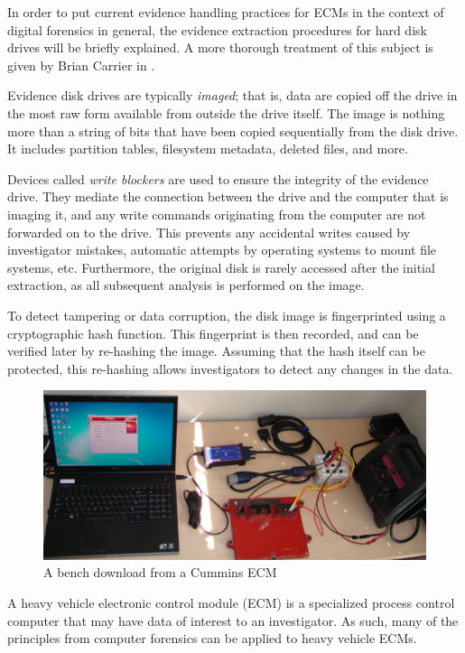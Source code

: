 In order to put current evidence handling practices for ECMs in the context of digital forensics in general, the evidence extraction
procedures for hard disk drives will be briefly explained. A more thorough treatment of this subject is given by Brian Carrier in \cite{carrier2005}.

Evidence disk drives are typically \emph{imaged}; that is, data are copied off the drive in the most raw form available from outside
the drive itself. The image is nothing more than a string of bits that have been copied sequentially from the disk drive. It includes
partition tables, filesystem metadata, deleted files, and more.

Devices called \emph{write blockers} are used to ensure the integrity of the evidence drive\cite{carrier2005}. They mediate the connection between the
drive and the computer that is imaging it, and any write commands originating from the computer are not forwarded on to the drive.
This prevents any accidental writes caused by investigator mistakes, automatic attempts by operating systems to mount file systems, etc.
Furthermore, the original disk is rarely accessed after the initial extraction, as all subsequent analysis is performed on the image.

To detect tampering or data corruption, the disk image is fingerprinted using a cryptographic hash function. This fingerprint is then recorded,
and can be verified later by re-hashing the image. Assuming that the hash itself can be protected, this re-hashing allows investigators to
detect any changes in the data.

\begin{figure}[h]
  \center
  \includegraphics[scale=0.5]{cumminsbench}
  \caption{A bench download from a Cummins ECM}
  \label{fig:cumminsbench}
\end{figure}


A heavy vehicle electronic control module (ECM) is a specialized process control computer that may have data of interest to an investigator. 
 As such, many of the principles from computer forensics can be applied to heavy vehicle ECMs.

